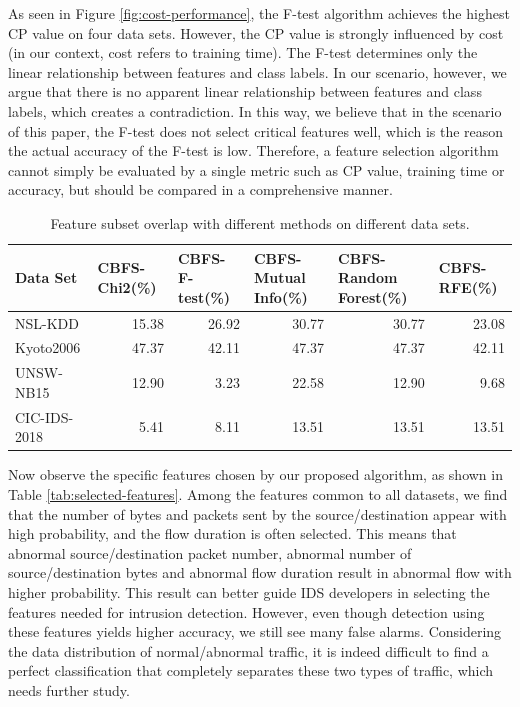 \documentclass{ieeeaccess}
\theoremstyle{definition}
\begin{document}
As seen in Figure \ref{fig:cost-performance}, the F-test algorithm achieves the highest CP value on four data sets. However, the CP value is strongly influenced by cost (in our context, cost refers to training time). The F-test determines only the linear relationship between features and class labels. In our scenario, however, we argue that there is no apparent linear relationship between features and class labels, which creates a contradiction. In this way, we believe that in the scenario of this paper, the F-test does not select critical features well, which is the reason the actual accuracy of the F-test is low. Therefore, a feature selection algorithm cannot simply be evaluated by a single metric such as CP value, training time or accuracy, but should be compared in a comprehensive manner.

\begin{table}[htbp]
    \centering
    \caption{Feature subset overlap with different methods on different data sets.}
    \begin{tabular}{lrrrrr}
    \toprule
    Data Set & \multicolumn{1}{l}{CBFS-Chi2(\%)} & \multicolumn{1}{l}{CBFS-F-test(\%)} & \multicolumn{1}{l}{CBFS-Mutual Info(\%)} & \multicolumn{1}{l}{CBFS-Random Forest(\%)} & \multicolumn{1}{l}{CBFS-RFE(\%)} \\
    \midrule
    NSL-KDD & 15.38  & 26.92  & 30.77  & 30.77  & 23.08  \\
    Kyoto2006 & 47.37  & 42.11  & 47.37  & 47.37  & 42.11  \\
    UNSW-NB15 & 12.90  & 3.23  & 22.58  & 12.90  & 9.68  \\
    CIC-IDS-2018 & 5.41  & 8.11  & 13.51  & 13.51  & 13.51  \\
    \bottomrule
    \end{tabular}%
    \label{tab:feature-overlap}%
\end{table}%


Now observe the specific features chosen by our proposed algorithm, as shown in Table \ref{tab:selected-features}. Among the features common to all datasets, we find that the number of bytes and packets sent by the source/destination appear with high probability, and the flow duration is often selected. This means that abnormal source/destination packet number, abnormal number of source/destination bytes and abnormal flow duration result in abnormal flow with higher probability. This result can better guide IDS developers in selecting the features needed for intrusion detection. However, even though detection using these features yields higher accuracy, we still see many false alarms. Considering the data distribution of normal/abnormal traffic, it is indeed difficult to find a perfect classification that completely separates these two types of traffic, which needs further study.
\end{document}
